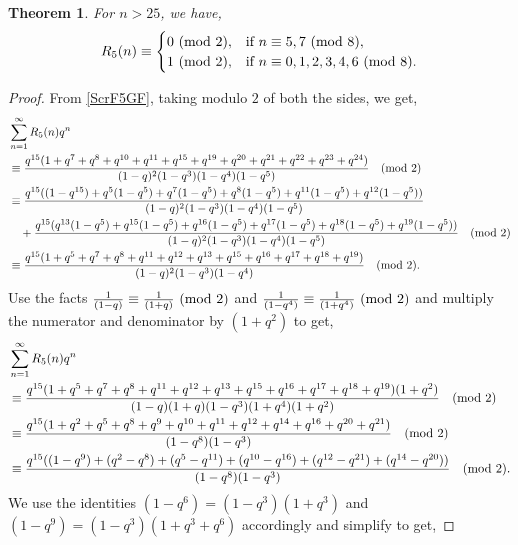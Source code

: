 \documentclass[12pt,reqno]{amsart}
\numberwithin{equation}{section}
\theoremstyle{plain}
\newtheorem{theorem}{Theorem}[section]
\begin{document}
	\begin{theorem}\label{R5CTh}
		For $n>25$, we have,
		\begin{align*}
			R_5(n)\equiv
			\begin{cases}
				0 \ (\textup{mod } 2), & \textup{if $n \equiv 5,7$ (mod 8)}, \\
				1 \ (\textup{mod } 2), & \textup{if $n \equiv 0,1,2,3,4,6$ (mod 8)}.
			\end{cases}
		\end{align*}
	\end{theorem}
		\begin{proof}
			From \eqref{ScrF5GF}, taking modulo $2$ of both the sides, we get,
			\begin{align*}
				&\sum_{n=1}^{\infty} R_5(n)q^n \\
				&\equiv \frac{q^{15}(1+q^7+q^8+q^{10}+q^{11}+q^{15}+q^{19}+q^{20}+q^{21}+q^{22}+q^{23}+q^{24})}{(1-q)^2(1-q^3)(1-q^4)(1-q^5)} \quad \textup{(mod 2)} \\
				&\equiv \frac{q^{15}((1-q^{15})+q^{5}(1-q^{5})+q^{7}(1-q^{5})+q^{8}(1-q^{5})+q^{11}(1-q^{5})+q^{12}(1-q^{5}))}{(1-q)^2(1-q^3)(1-q^4)(1-q^5)} \\
				&\quad + \frac{q^{15}(q^{13}(1-q^{5})+q^{15}(1-q^{5})+q^{16}(1-q^{5})+q^{17}(1-q^{5})+q^{18}(1-q^{5})+q^{19}(1-q^{5}))}{(1-q)^2(1-q^3)(1-q^4)(1-q^5)}  \quad \textup{(mod 2)} \\
				&\equiv \frac{q^{15}(1+q^5+q^7+q^8+q^{11}+q^{12}+q^{13}+q^{15}+q^{16}+q^{17}+q^{18}+q^{19})}{(1-q)^2(1-q^3)(1-q^4)} \quad \textup{(mod 2)}.
			\end{align*}
			Use the facts $\frac{1}{(1-q)} \equiv \frac{1}{(1+q)} \textup{ (mod 2)}$ and $\frac{1}{(1-q^4)} \equiv \frac{1}{(1+q^4)} \textup{ (mod 2)}$ and multiply the numerator and denominator by $(1+q^2)$ to get,
			\begin{align*}
				&\sum_{n=1}^{\infty} R_5(n)q^n \\
				&\equiv \frac{q^{15}(1+q^5+q^7+q^8+q^{11}+q^{12}+q^{13}+q^{15}+q^{16}+q^{17}+q^{18}+q^{19})(1+q^2)}{(1-q)(1+q)(1-q^3)(1+q^4)(1+q^2)} \quad \textup{(mod 2)} \\
				&\equiv \frac{q^{15}(1+q^2+q^5+q^8+q^9+q^{10}+q^{11}+q^{12}+q^{14}+q^{16}+q^{20}+q^{21})}{(1-q^8)(1-q^3)} \quad \textup{(mod 2)} \\
				& \equiv \frac{q^{15}((1-q^9)+(q^2-q^8)+(q^5-q^{11})+(q^{10}-q^{16})+(q^{12}-q^{21})+(q^{14}-q^{20}))}{(1-q^8)(1-q^3)} \quad \textup{(mod 2)}.
			\end{align*} 
			We use the identities $(1-q^6)=(1-q^3)(1+q^3)$ and $(1-q^9)=(1-q^3)(1+q^3+q^6)$ accordingly and simplify to get,

\end{proof}
\end{document}

